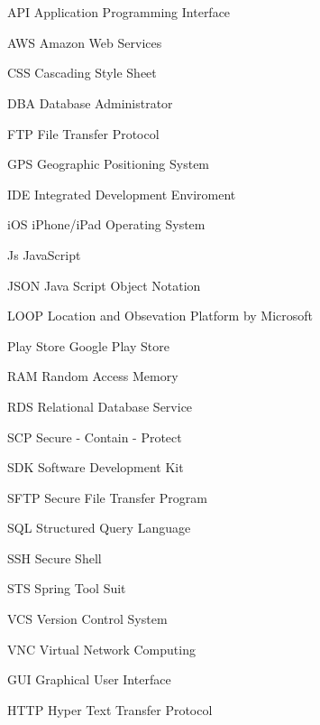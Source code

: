\newpage
\chapter*{\abbreviationName}
\vspace{-0.3em}


\begin{abbrv}
\item[API]					Application Programming Interface
\item[AWS]					Amazon Web Services
\item[CSS]					Cascading Style Sheet
\item[DBA]					Database Administrator
\item[FTP]					File Transfer Protocol
\item[GPS]					Geographic Positioning System
\item[IDE]					Integrated Development Enviroment
\item[iOS]					iPhone/iPad Operating System
\item[Js]					JavaScript
\item[JSON]					Java Script Object Notation
\item[LOOP]					Location and Obsevation Platform by Microsoft
\item[Play Store]			Google Play Store
\item[RAM]				    Random Access Memory
\item[RDS]				    Relational Database Service
\item[SCP]                  Secure - Contain - Protect
\item[SDK]                  Software Development Kit
\item[SFTP]                 Secure File Transfer Program
\item[SQL]                  Structured Query Language
\item[SSH]                  Secure Shell
\item[STS]                  Spring Tool Suit
\item[VCS]					Version Control System
\item[VNC]					Virtual Network Computing
\item[GUI]					Graphical User Interface
\item[HTTP]					Hyper Text Transfer Protocol
\end{abbrv}
